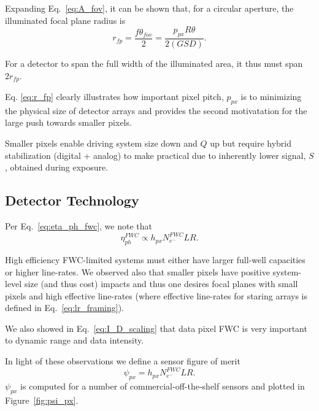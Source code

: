 \documentclass[]{spieman}  %
\begin{document}
Expanding Eq.~\eqref{eq:A_fov}, it can be shown that, for a circular aperture, the illuminated focal plane radius is
\begin{equation}
    \label{eq:r_fp}
    r_{fp} = \frac{f\theta_{fov}}{2} = \frac{p_{px}R\theta}{2 (GSD)}.
\end{equation}

For a detector to span the full width of the illuminated area, it thus must span $2 r_{fp}$. 

Eq. \eqref{eq:r_fp} clearly illustrates how important pixel pitch, $p_{px}$ is to minimizing the physical size of detector arrays and provides the second motivatation for the large push towards smaller pixels.

\begin{observation}
\label{obs:small_pix}
Smaller pixels enable driving system size down and $Q$ up but require hybrid stabilization (digital + analog) to make practical due to inherently lower signal, $S$, obtained during exposure.
\end{observation}

\subsection{Detector Technology}
\label{sec:detector_tech}

Per Eq.~\eqref{eq:eta_ph_fwc}, we note that 
\begin{equation}
    \eta_{ph}^{FWC} \propto h_{px}N_{e^-}^{FWC}LR.
\end{equation}

High efficiency FWC-limited systems must either have larger full-well capacities or higher line-rates.  We observed also that smaller pixels have positive system-level size (and thus cost) impacts and thus one desires focal planes with small pixels and high effective line-rates (where effective line-rates for staring arrays is defined in Eq.~\eqref{eq:lr_framing}).

We also showed in Eq.~\eqref{eq:I_D_scaling} that data pixel FWC is very important to dynamic range and data intensity.

In light of these observations we define a sensor figure of merit
\begin{equation}
    \psi_{px} = h_{px}N_{e^-}^{FWC}LR%
    \label{eq:psi_px}.
\end{equation}
$\psi_{px}$ is computed for a number of commercial-off-the-shelf sensors and plotted in Figure~\ref{fig:psi_px}.
\end{document}

